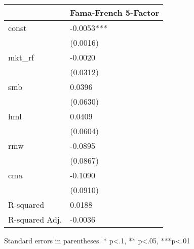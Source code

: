\begin{table}
\caption{}
\label{}
\begin{center}
\begin{tabular}{ll}
\hline
               & Fama-French 5-Factor  \\
\hline
const          & -0.0053***            \\
               & (0.0016)              \\
mkt\_rf        & -0.0020               \\
               & (0.0312)              \\
smb            & 0.0396                \\
               & (0.0630)              \\
hml            & 0.0409                \\
               & (0.0604)              \\
rmw            & -0.0895               \\
               & (0.0867)              \\
cma            & -0.1090               \\
               & (0.0910)              \\
R-squared      & 0.0188                \\
R-squared Adj. & -0.0036               \\
\hline
\end{tabular}
\end{center}
\end{table}
\bigskip
Standard errors in parentheses. \newline 
* p<.1, ** p<.05, ***p<.01